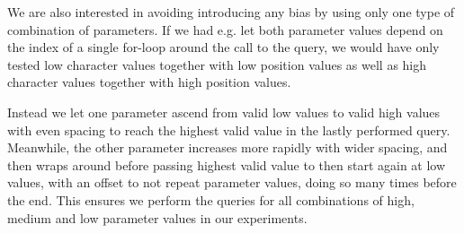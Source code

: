 We are also interested in avoiding introducing any bias by using only one type of combination of parameters.
If we had e.g. let both parameter values depend on the index of a single for-loop around the call to the query, we would have only tested low character values together with low position values as well as high character values together with high position values.

Instead we let one parameter ascend from valid low values to valid high values with even spacing to reach the highest valid value in the lastly performed query. Meanwhile, the other parameter increases more rapidly with wider spacing, and then wraps around before passing highest valid value to then start again at low values, with an offset to not repeat parameter values, doing so many times before the end.
This ensures we perform the queries for all combinations of high, medium and low parameter values in our experiments.
